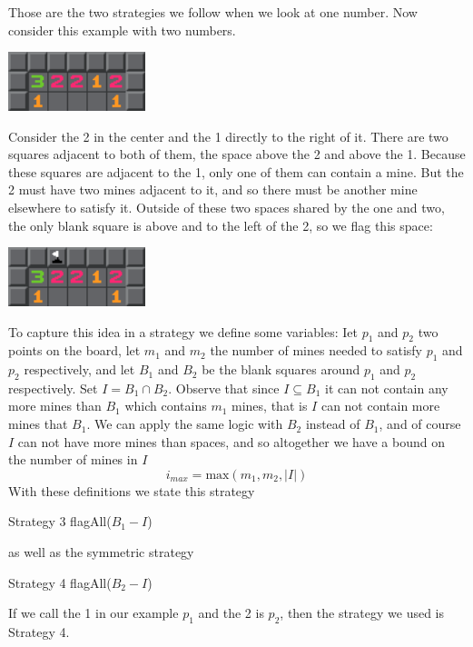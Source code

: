 \documentclass{article}
\theoremstyle{definition}
\theoremstyle{definition}
\theoremstyle{theorem}
\begin{document}
	Those are the two strategies we follow when we look at one number. Now consider this example with two numbers. 
	\begin{center}
		\includegraphics[width=0.3\textwidth]{exampleimages/example2a}
	\end{center}
	Consider the 2 in the center and the 1 directly to the right of it. There are two squares adjacent to both of them, the space above the 2 and above the 1. Because these squares are adjacent to the 1, only one of them can contain a mine. But the 2 must have two mines adjacent to it, and so there must be another mine elsewhere to satisfy it. Outside of these two spaces shared by the one and two, the only blank square is above and to the left of the 2, so we flag this space:
	\begin{center}
		\includegraphics[width=0.3\textwidth]{exampleimages/example2b}
	\end{center}
	To capture this idea in a strategy we define some variables: Iet $p_1$ and $p_2$ two points on the board, let $m_1$ and $m_2$ the number of mines needed to satisfy $p_1$ and $p_2$ respectively, and let $B_1$ and $B_2$ be the blank squares around $p_1$ and $p_2$ respectively. Set $I = B_1 \cap B_2$.  Observe that since $I \subseteq B_1$ it can not contain any more mines than $B_1$ which contains $m_1$ mines, that is $I$ can not contain more mines that $B_1$. We can apply the same logic with $B_2$ instead of $B_1$, and of course $I$ can not have more mines than spaces, and so altogether we have a bound on the number of mines in $I$
	$$i _{max} = \textrm{max}(m_1,m_2,|I|) $$
	With these definitions we state this strategy
	\begin{algorithmic}
		 \Comment Strategy 3
		\State flagAll($B_1 - I$)
		\EndIf
	\end{algorithmic}
	as well as the symmetric strategy
	\begin{algorithmic}
		 \Comment Strategy 4
		\State flagAll($B_2 - I$)
		\EndIf
	\end{algorithmic}
	If we call the 1 in our example $p_1$ and the 2 is $p_2$, then the strategy we used is Strategy 4. 
	
\end{document}
